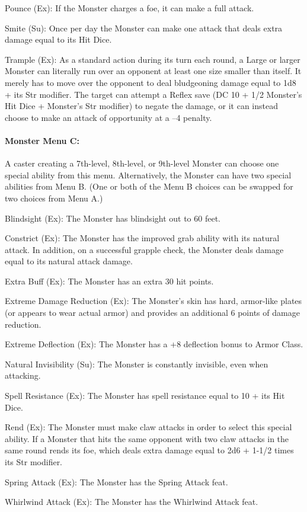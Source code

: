 \begin{list}{}{\leftmargin=1em}
\item Pounce (Ex): If the Monster charges a foe, it can make a full attack. 
\item Smite (Su): Once per day the Monster can make one attack that deals extra damage equal to its Hit Dice.
\item Trample (Ex): As a standard action during its turn each round, 
a Large or larger Monster can literally run over an opponent at least one size smaller than itself. 
It merely has to move over the opponent to deal bludgeoning damage equal to 1d8 + its Str modifier. 
The target can attempt a Reflex save (DC 10 + 1/2 Monster's Hit Dice + Monster's Str modifier) 
to negate the damage, or it can instead choose to make an attack of opportunity at a –4 penalty.
\end{list}

\paragraph{Monster Menu C:}

A caster creating a 7th-level, 8th-level, or 9th-level Monster 
can choose one special ability from this menu. 
Alternatively, the Monster can have two special abilities from Menu B. 
(One or both of the Menu B choices can be swapped for two choices from Menu A.)
\begin{list}{}{\leftmargin=1em}
\item Blindsight (Ex): The Monster has blindsight out to 60 feet.
\item Constrict (Ex): The Monster has the improved grab ability with its natural attack. 
In addition, on a successful grapple check, the Monster deals damage equal to its natural attack damage.
\item Extra Buff (Ex): The Monster has an extra 30 hit points.
\item Extreme Damage Reduction (Ex): The Monster's skin has hard, 
armor-like plates (or appears to wear actual armor) and provides an additional 6 points of damage reduction.
\item Extreme Deflection (Ex): The Monster has a +8 deflection bonus to Armor Class.
\item Natural Invisibility (Su): The Monster is constantly invisible, even when attacking. 
\item Spell Resistance (Ex): The Monster has spell resistance equal to 10 + its Hit Dice.
\item Rend (Ex): The Monster must make claw attacks in order to select this special ability. If a Monster that hits the same opponent with two claw attacks in the same round rends its foe, which deals extra damage equal to 2d6 + 1-1/2 times its Str modifier.
\item Spring Attack (Ex): The Monster has the Spring Attack feat.
\item Whirlwind Attack (Ex): The Monster has the Whirlwind Attack feat.
\end{list}
